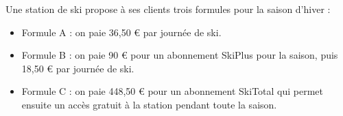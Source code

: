 
\medskip

Une station de ski propose à ses clients trois formules pour la saison d'hiver :

\begin{itemize}
	\item Formule A : on paie 36,50 \euro{} par journée de ski.
	
	\item Formule B : on paie 90 \euro{} pour un abonnement \og  SkiPlus  \fg{} pour la saison, puis 18,50 \euro{} par journée de ski.
	
	\item Formule C : on paie 448,50 \euro{} pour un abonnement \og  SkiTotal  \fg{} qui permet ensuite un accès gratuit à la station pendant toute la saison.
\end{itemize}

\medskip

